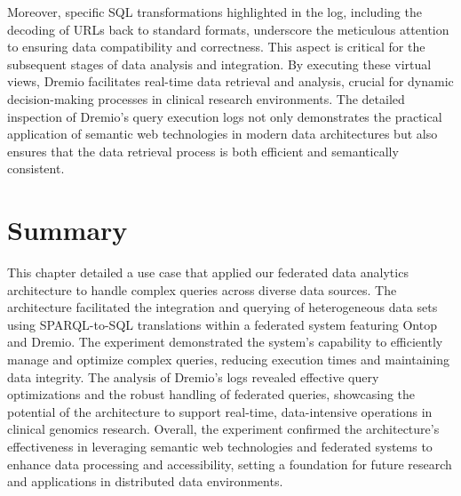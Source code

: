 Moreover, specific SQL transformations highlighted in the log, including the decoding of URLs back to standard formats, underscore the meticulous attention to ensuring data compatibility and correctness. This aspect is critical for the subsequent stages of data analysis and integration.
By executing these virtual views, Dremio facilitates real-time data retrieval and analysis, crucial for dynamic decision-making processes in clinical research environments. The detailed inspection of Dremio's query execution logs not only demonstrates the practical application of semantic web technologies in modern data architectures but also ensures that the data retrieval process is both efficient and semantically consistent.

\section{Summary}
This chapter detailed a use case that applied our federated data analytics architecture to handle complex queries across diverse data sources. The architecture facilitated the integration and querying of heterogeneous data sets using SPARQL-to-SQL translations within a federated system featuring Ontop and Dremio.
The experiment demonstrated the system's capability to efficiently manage and optimize complex queries, reducing execution times and maintaining data integrity. The analysis of Dremio's logs revealed effective query optimizations and the robust handling of federated queries, showcasing the potential of the architecture to support real-time, data-intensive operations in clinical genomics research.
Overall, the experiment confirmed the architecture's effectiveness in leveraging semantic web technologies and federated systems to enhance data processing and accessibility, setting a foundation for future research and applications in distributed data environments.